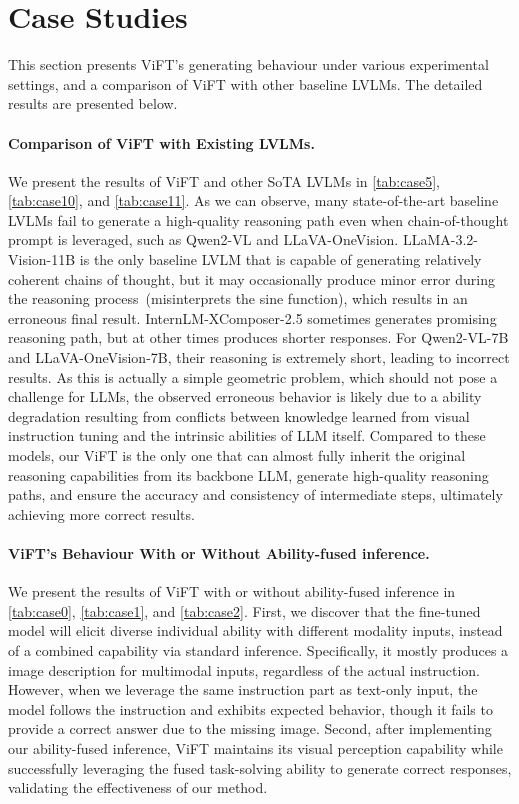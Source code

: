 \section{Case Studies}\label{apdx-cases} 
This section presents ViFT's generating behaviour under various experimental settings, and a comparison of ViFT with other baseline LVLMs. The detailed results are presented below.

\paragraph{Comparison of ViFT with Existing LVLMs.}  We present the results of ViFT and other SoTA LVLMs in \autoref{tab:case5}, \autoref{tab:case10}, and \autoref{tab:case11}. As we can observe, many state-of-the-art baseline LVLMs fail to  generate a high-quality reasoning path even when chain-of-thought prompt is leveraged, such as Qwen2-VL and LLaVA-OneVision. LLaMA-3.2-Vision-11B is the only baseline LVLM that is capable of generating relatively coherent chains of thought, but it may occasionally produce minor error during the reasoning process~(\eg misinterprets the sine function), which results in an erroneous final result. InternLM-XComposer-2.5 sometimes generates promising reasoning path, but at other times produces shorter responses. For Qwen2-VL-7B and LLaVA-OneVision-7B, their reasoning is extremely short, leading to incorrect results. As this is actually a simple geometric problem, which should not pose a challenge for LLMs, the observed erroneous behavior is likely due to a ability degradation resulting from conflicts between knowledge learned from visual instruction tuning and the intrinsic abilities of LLM itself. Compared to these models, our ViFT is the only one that can almost fully inherit the original reasoning capabilities from its backbone LLM, generate high-quality reasoning paths, and ensure the accuracy and consistency of intermediate steps, ultimately achieving more correct results.

\paragraph{ViFT's Behaviour With or Without Ability-fused inference.}

We present the results of ViFT with or without ability-fused inference in \autoref{tab:case0}, \autoref{tab:case1}, and \autoref{tab:case2}. First, we discover that the fine-tuned model will elicit diverse individual ability with different modality inputs, instead of a combined capability via standard inference. Specifically, it mostly produces a image description for multimodal inputs, regardless of the actual instruction. However, when we leverage the same instruction part as text-only input, the model follows the instruction and exhibits expected behavior, though it fails to provide a correct answer due to the missing image. Second, after implementing our ability-fused inference, ViFT maintains its visual perception capability while successfully leveraging the fused task-solving ability to generate correct responses, validating the effectiveness of our method.

